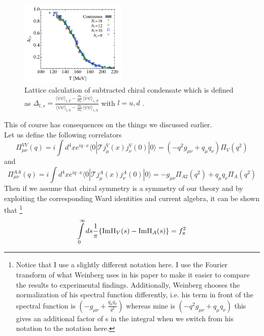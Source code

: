 \begin{figure}[b]
	\centering
	\includegraphics[width=0.45\textwidth]{Figures/ChiralOrderParameterLattice}
	\caption{Lattice calculation of subtracted chiral condensate which is defined as $ \Delta_{l,s} = \frac{\langle \bar{\psi} \psi \rangle_{l,T} - \frac{m_l}{m_s} \langle \bar{\psi} \psi \rangle_{s,T}}{\langle \bar{\psi} \psi \rangle_{l,0} - \frac{m_l}{m_s} \langle \bar{\psi} \psi \rangle_{s,0}}$ with $l = u,d$ \cite{OrdParLat}.}
	\label{fig:ordparlat}
\end{figure}
This of course has consequences on the things we discussed earlier. \\
Let us define the following correlators
\begin{equation}
\label{eqn:corV}
\Pi_{\mu\nu}^{VV} (q) = i \int d^4x e^{iq \cdot x} \langle 0 | \mathcal{T} j^V_{\mu}(x)j^V_{\nu}(0) | 0 \rangle = \left( -q^2 g_{\mu\nu} + q_{\mu}q_{\nu} \right) \Pi_V(q^2)
\end{equation}
and
\begin{equation}
\label{eqn:corA}
\Pi_{\mu\nu}^{AA} (q) = i \int d^4x e^{iq \cdot x} \langle 0 | \mathcal{T} j^A_{\mu}(x)j^A_{\nu}(0) | 0 \rangle = -g_{\mu\nu} \Pi_{A2}(q^2) + q_{\mu}q_{\nu} \Pi_A(q^2)
\end{equation}
Then if we assume that chiral symmetry is a symmetry of our theory and by exploiting the corresponding Ward identities and current algebra, it can be shown that \cite{WeinbergAVmixing}\footnote{Notice that I use a slightly different notation here. I use the Fourier transform of what Weinberg uses in his paper to make it easier to compare the results to experimental findings. Additionally, Weinberg chooses the normalization of his spectral function differently, i.e. his term in front of the spectral function is $\left( -g_{\mu\nu} + \frac{q_{\mu}q_{\nu}}{q^2} \right)$ whereas mine is $\left( -q^2 g_{\mu\nu} + q_{\mu}q_{\nu} \right)$ this gives an additional factor of s in the integral when we switch from his notation to the notation here.}
\begin{equation}
\int\limits_0^{\infty} ds \frac{1}{\pi} \lbrace \mathrm{Im}\Pi_V(s) - \mathrm{Im}\Pi_A(s) \rbrace = f_{\pi}^2
\end{equation} 

